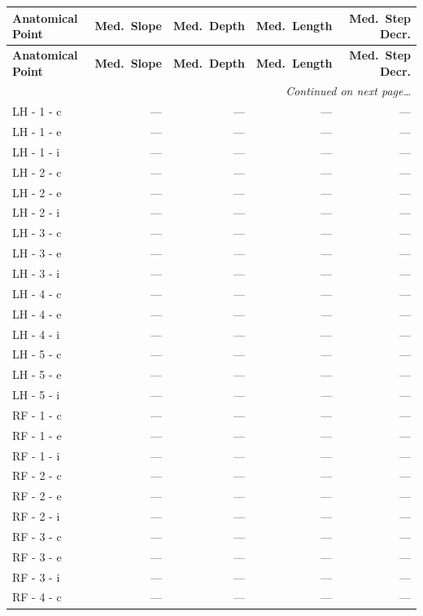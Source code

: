 \documentclass[a4paper,11pt]{article}
\begin{document}
\begin{small}
\begin{longtable}{p{4.5cm}rrrr}
\toprule
\textbf{Anatomical Point} &
\textbf{Med.\ Slope} &
\textbf{Med.\ Depth} &
\textbf{Med.\ Length} &
\textbf{Med.\ Step Decr.} \\
\midrule
\endfirsthead
\toprule
\textbf{Anatomical Point} &
\textbf{Med.\ Slope} &
\textbf{Med.\ Depth} &
\textbf{Med.\ Length} &
\textbf{Med.\ Step Decr.} \\
\midrule
\endhead
\midrule
\multicolumn{5}{r}{\small\emph{Continued on next page\ldots}} \\
\endfoot
\bottomrule
\endlastfoot
LH - 1 - c & --- & --- & --- & --- \\
LH - 1 - e & --- & --- & --- & --- \\
LH - 1 - i & --- & --- & --- & --- \\
LH - 2 - c & --- & --- & --- & --- \\
LH - 2 - e & --- & --- & --- & --- \\
LH - 2 - i & --- & --- & --- & --- \\
LH - 3 - c & --- & --- & --- & --- \\
LH - 3 - e & --- & --- & --- & --- \\
LH - 3 - i & --- & --- & --- & --- \\
LH - 4 - c & --- & --- & --- & --- \\
LH - 4 - e & --- & --- & --- & --- \\
LH - 4 - i & --- & --- & --- & --- \\
LH - 5 - c & --- & --- & --- & --- \\
LH - 5 - e & --- & --- & --- & --- \\
LH - 5 - i & --- & --- & --- & --- \\
RF - 1 - c & --- & --- & --- & --- \\
RF - 1 - e & --- & --- & --- & --- \\
RF - 1 - i & --- & --- & --- & --- \\
RF - 2 - c & --- & --- & --- & --- \\
RF - 2 - e & --- & --- & --- & --- \\
RF - 2 - i & --- & --- & --- & --- \\
RF - 3 - c & --- & --- & --- & --- \\
RF - 3 - e & --- & --- & --- & --- \\
RF - 3 - i & --- & --- & --- & --- \\
RF - 4 - c & --- & --- & --- & --- \\

\end{longtable}
\end{small}
\end{document}
